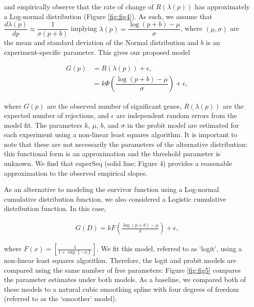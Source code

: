 \documentclass[11pt]{article}
\begin{document}
\noindent and empirically observe that the rate of change of $R(\lambda(p))$ has approximately a Log-normal distribution (Figure \ref{fig:fig4}). As such, we assume that $\dfrac{d\lambda(p)}{dp} \approx \dfrac{1}{\sigma(p+b)}$ implying $\lambda(p) = \dfrac{\log(p+b) - \mu}{\sigma}$, where $(\mu, \sigma)$ are the mean and standard deviation of the Normal distribution and $b$ is an experiment-specific parameter. This gives our proposed model

$$
\begin{aligned}
G(p) &= R(\lambda(p)) + \epsilon, \\
 &= k \Phi\left(\dfrac{\log(p+b) -\mu}{\sigma}\right) + \epsilon,
\end{aligned}
$$

\noindent where $G(p)$ are the observed number of significant genes, $R(\lambda(p))$ are the expected number of rejections, and $\epsilon$ are independent random errors from the model fit. The parameters $k$, $\mu$, $b$, and $\sigma$ in the probit model are estimated for each experiment using a non-linear least squares algorithm. It is important to note that these are not necessarily the parameters of the alternative distribution: this functional form is an approximation and the threshold parameter is unknown. We find that superSeq (solid line; Figure 4) provides a reasonable approximation to the observed empirical slopes.

As an alternative to modeling the survivor function using a Log-normal cumulative distribution function, we also considered a Logistic cumulative distribution function. In this case,

$$
\begin{aligned}
G(D) = k F\left(\frac{\log(p+b) - \mu}{\sigma}\right) + \epsilon,
\end{aligned}
$$

\noindent where $F(x) = \left[\frac{1}{1 + \exp\left\{ -x\right\} }\right]$. We fit this model, referred to as `logit', using a non-linear least squares algorithm. Therefore, the logit and probit models are compared using the same number of free parameters: Figure \ref{fig:fig5} compares the parameter estimates under both models. As a baseline, we compared both of these models to a natural cubic smoothing spline with four degrees of freedom (referred to as the `smoother' model).

\clearpage
\end{document}
